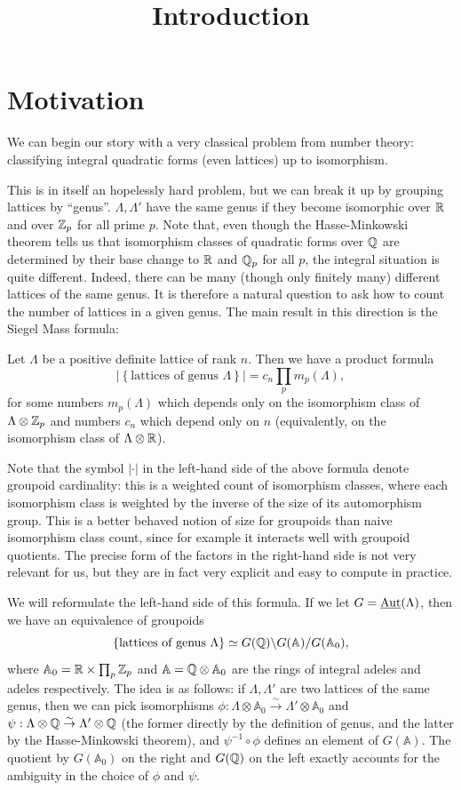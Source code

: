 \documentclass[oneside]{amsart}
\title{Introduction}
\renewcommand{\A}{\mathbb{A}}
\begin{document}
\maketitle

\section{Motivation}

We can begin our story with a very classical problem from number theory: classifying integral quadratic forms (even lattices) up to isomorphism.

This is in itself an hopelessly hard problem, but we can break it up by grouping lattices by ``genus''. $\Lambda,\Lambda'$ have the same genus if they become isomorphic over $\mathbb R$ and over $\mathbb Z_p$ for all prime $p$. Note that, even though the Hasse-Minkowski theorem tells us that isomorphism classes of quadratic forms over $\mathbb Q$ are determined by their base change to $\mathbb R$ and $\mathbb Q_p$ for all $p$, the integral situation is quite different. Indeed, there can be many (though only finitely many) different lattices of the same genus. It is therefore a natural question to ask how to count the number of lattices in a given genus. The main result in this direction is the Siegel Mass formula:

\begin{theorem}[Siegel]
Let $\Lambda$ be a positive definite lattice of rank $n$. Then we have a product formula
\[
\left| \left\{ \text{lattices of genus }\Lambda \right\}  \right| = c_n \prod_p m_p(\Lambda),
\] 
for some numbers $m_p(\Lambda)$ which depends only on the isomorphism class of $\Lambda\otimes \mathbb Z_p$ and numbers $c_n$ which depend only on $n$ (equivalently, on the isomorphism class of $\Lambda\otimes \mathbb R$).
\end{theorem}
Note that the symbol $|\cdot|$ in the left-hand side of the above formula denote groupoid cardinality: this is a weighted count of isomorphism classes, where each isomorphism class is weighted by the inverse of the size of its automorphism group. This is a better behaved notion of size for groupoids than naive isomorphism class count, since for example it interacts well with groupoid quotients. The precise form of the factors in the right-hand side is not very relevant for us, but they are in fact very explicit and easy to compute in practice.

We will reformulate the left-hand side of this formula. If we let $G=\underline{\operatorname{Aut}}(\Lambda)$, then we have an equivalence of groupoids
\[
\{\text{lattices of genus }\Lambda\} \isoto G(\Q)\backslash G(\A) /G(\A_0),
\] 
where $\A_0 = \R\times \prod_p \Z_p$ and $\A = \Q\otimes \A_0$ are the rings of integral adeles and adeles respectively. The idea is as follows: if $\Lambda, \Lambda'$ are two lattices of the same genus, then we can pick isomorphisms $\phi: \Lambda\otimes \A_0 \overset{\sim}{\to} \Lambda'\otimes \A_0$ and $\psi :\Lambda\otimes \Q \overset{\sim}{\to} \Lambda'\otimes \Q$ (the former directly by the definition of genus, and the latter by the Hasse-Minkowski theorem), and $\psi^{-1} \circ \phi$ defines an element of $G(\A)$. The quotient by $G(\A_0)$ on the right and $G(\mathbb Q)$ on the left exactly accounts for the ambiguity in the choice of $\phi$ and $\psi$.
\end{document}

